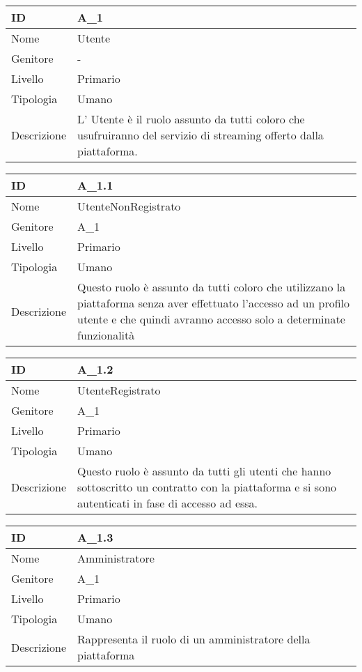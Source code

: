 \begin{center}

\begin{tabular}{ |p{2cm}|p{10cm}|  }
\hline
ID & A\_1 \\\hline
Nome & Utente\\\hline
Genitore & - \\\hline
Livello &  Primario \\\hline
Tipologia & Umano \\\hline
Descrizione &  L' Utente è il ruolo assunto da tutti coloro che usufruiranno del servizio di streaming offerto dalla piattaforma. \\\hline
\end{tabular}
\label{table_attore:1}\newline

\begin{tabular}{ |p{2cm}|p{10cm}|  }
\hline
ID & A\_1.1 \\\hline
Nome & UtenteNonRegistrato\\\hline
Genitore & A\_1 \\\hline
Livello &  Primario \\\hline
Tipologia & Umano \\\hline
Descrizione &  Questo ruolo è assunto da tutti coloro che utilizzano la piattaforma senza aver effettuato l'accesso ad un profilo utente e che quindi avranno accesso solo a determinate funzionalità \\\hline
\end{tabular}
\label{table_attore:1.1}\newline

\begin{tabular}{ |p{2cm}|p{10cm}|  }
\hline
ID & A\_1.2 \\\hline
Nome & UtenteRegistrato\\\hline
Genitore & A\_1 \\\hline
Livello &  Primario \\\hline
Tipologia & Umano \\\hline
Descrizione &  Questo ruolo è assunto da tutti gli utenti che hanno sottoscritto un contratto con la piattaforma e si sono autenticati in fase di accesso ad essa. \\\hline
\end{tabular}
\label{table_attore:1.2}\newline

\begin{tabular}{ |p{2cm}|p{10cm}|  }
\hline
ID & A\_1.3 \\\hline
Nome & Amministratore\\\hline
Genitore & A\_1\\\hline
Livello &  Primario \\\hline
Tipologia & Umano \\\hline
Descrizione &  Rappresenta il ruolo di un amministratore della piattaforma \\\hline
\end{tabular}
\label{table_attore:1.3}\newline


\end{center}
